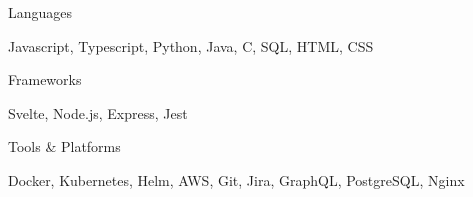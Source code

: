 

\begin{cventries}

  \cventry
    {Languages} %
    {
      \begin{cvitems} %
        \item {Javascript, Typescript, Python, Java, C, SQL, HTML, CSS}
      \end{cvitems}
    }

  \cventry
    {Frameworks} %
    {
      \begin{cvitems} %
        \item {Svelte, Node.js, Express, Jest}
      \end{cvitems}
    }
  \cventry
    {Tools & Platforms} %
    {
      \begin{cvitems} %
        \item {Docker, Kubernetes, Helm, AWS, Git, Jira, GraphQL, PostgreSQL, Nginx}
      \end{cvitems}
    }

\end{cventries}
